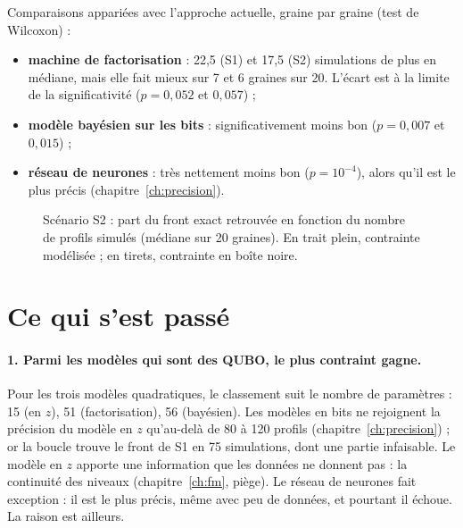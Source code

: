 Comparaisons appariées avec l'approche actuelle, graine par graine (test de Wilcoxon) :
\begin{itemize}
\item \textbf{machine de factorisation} : 22,5 (S1) et 17,5 (S2) simulations de plus en médiane, mais elle fait mieux sur 7 et 6 graines sur 20. L'écart est à la limite de la significativité ($p=0{,}052$ et $0{,}057$) ;
\item \textbf{modèle bayésien sur les bits} : significativement moins bon ($p=0{,}007$ et $0{,}015$) ;
\item \textbf{réseau de neurones} : très nettement moins bon ($p=10^{-4}$), alors qu'il est le plus précis (chapitre~\ref{ch:precision}).
\end{itemize}

\begin{figure}[htbp]
\centering

\caption{Scénario S2 : part du front exact retrouvée en fonction du nombre de profils simulés (médiane sur 20 graines). En trait plein, contrainte modélisée ; en tirets, contrainte en boîte noire.}\label{fig:v2-s2}
\end{figure}

\section{Ce qui s'est passé}
\paragraph{1. Parmi les modèles qui sont des QUBO, le plus contraint gagne.} Pour les trois modèles quadratiques, le classement suit le nombre de paramètres : 15 (en $z$), 51 (factorisation), 56 (bayésien). Les modèles en bits ne rejoignent la précision du modèle en $z$ qu'au-delà de 80 à 120 profils (chapitre~\ref{ch:precision}) ; or la boucle trouve le front de S1 en 75 simulations, dont une partie infaisable. Le modèle en $z$ apporte une information que les données ne donnent pas : la continuité des niveaux (chapitre~\ref{ch:fm}, piège). Le réseau de neurones fait exception : il est le plus précis, même avec peu de données, et pourtant il échoue. La raison est ailleurs.

